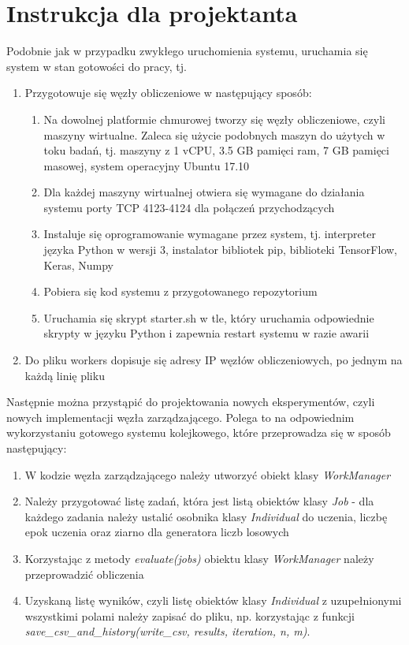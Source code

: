 \chapter[Dodatek D]{Instrukcja dla projektanta}
Podobnie jak w przypadku zwykłego uruchomienia systemu, uruchamia się system w stan gotowości do pracy, tj.
\begin{enumerate}
  \item Przygotowuje się węzły obliczeniowe w następujący sposób:
  \begin{enumerate}
    \item Na dowolnej platformie chmurowej tworzy się węzły obliczeniowe, czyli maszyny wirtualne.
    Zaleca się użycie podobnych maszyn do użytych w toku badań, tj. maszyny z 1 vCPU, 3.5 GB pamięci ram, 7 GB pamięci masowej, system operacyjny Ubuntu 17.10
    \item Dla każdej maszyny wirtualnej otwiera się wymagane do działania systemu porty TCP 4123-4124 dla połączeń przychodzących
    \item Instaluje się oprogramowanie wymagane przez system, tj. interpreter języka Python w wersji 3, instalator bibliotek pip, biblioteki TensorFlow, Keras, Numpy
    \item Pobiera się kod systemu z przygotowanego repozytorium
    \item Uruchamia się skrypt starter.sh w tle, który uruchamia odpowiednie skrypty w języku Python i zapewnia restart systemu w razie awarii
  \end{enumerate}
  \item Do pliku workers dopisuje się adresy IP węzłów obliczeniowych, po jednym na każdą linię pliku
\end{enumerate}

Następnie można przystąpić do projektowania nowych eksperymentów, czyli nowych implementacji węzła zarządzającego.
Polega to na odpowiednim wykorzystaniu gotowego systemu kolejkowego, które przeprowadza się w sposób następujący:
\begin{enumerate}
  \item W kodzie węzła zarządzającego należy utworzyć obiekt klasy \textit{WorkManager}
  \item Należy przygotować listę zadań, która jest listą obiektów klasy \textit{Job} - dla każdego zadania należy ustalić osobnika klasy \textit{Individual} do uczenia, liczbę epok uczenia oraz ziarno dla generatora liczb losowych
  \item Korzystając z metody \textit{evaluate(jobs)} obiektu klasy \textit{WorkManager} należy przeprowadzić obliczenia
  \item Uzyskaną listę wyników, czyli listę obiektów klasy \textit{Individual} z uzupełnionymi wszystkimi polami należy zapisać do pliku, np. korzystając z funkcji \textit{save\_csv\_and\_history(write\_csv, results, iteration, n, m)}.
\end{enumerate}


